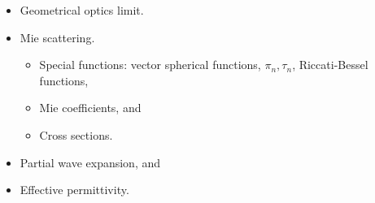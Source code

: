 \documentclass[hyperref, a4paper]{article}
\begin{document}
\begin{itemize}
    \item Geometrical optics limit.
    \item Mie scattering.
    \begin{itemize}
        \item Special functions: vector spherical functions, $\pi_n, \tau_n$, Riccati-Bessel functions,
        \item Mie coefficients, and
        \item Cross sections.        
    \end{itemize}
    \item Partial wave expansion, and
    \item Effective permittivity.
\end{itemize}
\end{document}
